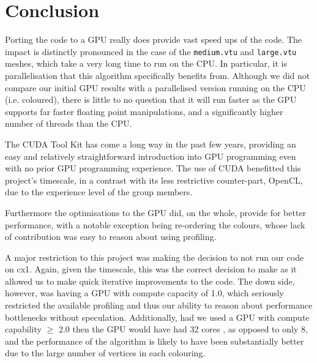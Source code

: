 \section{Conclusion}
Porting the code to a GPU really does provide vast speed ups of the code. The impact is distinctly pronounced in the case of the \texttt{medium.vtu} and \texttt{large.vtu} meshes, which take a very long time to run on the CPU.
In particular, it is parallelisation that this algorithm specifically benefits from. Although we did not compare our initial GPU results with a parallelised version running on the CPU (i.e. coloured), there is little to no question that it will run faster as the GPU supports far faster floating point manipulations, and a significantly higher number of threads than the CPU.

The CUDA Tool Kit has come a long way in the past few years, providing an easy and relatively straightforward introduction into GPU programming even with no prior GPU programming experience. The use of CUDA benefitted this project's timescale, in a contrast with its less restrictive counter-part, OpenCL, due to the experience level of the group members.

Furthermore the optimisations to the GPU did, on the whole, provide for better performance, with a notable exception being re-ordering the colours, whose lack of contribution was easy to reason about using profiling.

A major restriction to this project was making the decision to not run our code on cx1. Again, given the timescale, this was the correct decision to make as it allowed us to make quick iterative improvements to the code. The down side, however, was having a GPU with compute capacity of 1.0, which seriously restricted the available profiling and thus our ability to reason about performance bottlenecks without speculation.
Additionally, had we used a GPU with compute capability $\ge$ 2.0 then the GPU would have had 32 cores \cite{compute_2.0}, as opposed to only 8, and the performance of the algorithm is likely to have been substantially better due to the large number of vertices in each colouring.
